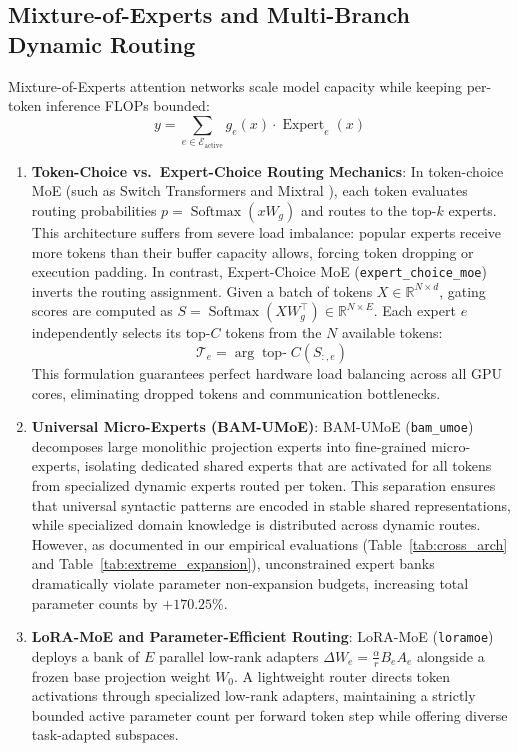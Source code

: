 \documentclass{article}
\begin{document}
\subsection{Mixture-of-Experts and Multi-Branch Dynamic Routing}
Mixture-of-Experts attention networks scale model capacity while keeping per-token inference FLOPs bounded:
\begin{equation}
    y = \sum_{e \in \mathcal{E}_{\text{active}}} g_e(x) \cdot \operatorname{Expert}_e(x)
\end{equation}
\begin{enumerate}
    \item \textbf{Token-Choice vs.\ Expert-Choice Routing Mechanics}:
    In token-choice MoE (such as Switch Transformers \citep{fedus2022switch} and Mixtral \citep{jiang2024mixtral}), each token evaluates routing probabilities $p = \operatorname{Softmax}(x W_g)$ and routes to the top-$k$ experts. This architecture suffers from severe load imbalance: popular experts receive more tokens than their buffer capacity allows, forcing token dropping or execution padding.
    In contrast, Expert-Choice MoE (\texttt{expert\_choice\_moe}) \citep{expert_choice_moe_2022} inverts the routing assignment. Given a batch of tokens $X \in \mathbb{R}^{N \times d}$, gating scores are computed as $S = \operatorname{Softmax}(X W_g^\top) \in \mathbb{R}^{N \times E}$. Each expert $e$ independently selects its top-$C$ tokens from the $N$ available tokens:
    \begin{equation}
        \mathcal{T}_e = \arg\operatorname{top-}C (S_{:, e})
    \end{equation}
    This formulation guarantees perfect hardware load balancing across all GPU cores, eliminating dropped tokens and communication bottlenecks.
    \item \textbf{Universal Micro-Experts (BAM-UMoE)}:
    BAM-UMoE (\texttt{bam\_umoe}) \citep{bam_umoe_2025} decomposes large monolithic projection experts into fine-grained micro-experts, isolating dedicated shared experts that are activated for all tokens from specialized dynamic experts routed per token. This separation ensures that universal syntactic patterns are encoded in stable shared representations, while specialized domain knowledge is distributed across dynamic routes. However, as documented in our empirical evaluations (Table~\ref{tab:cross_arch} and Table~\ref{tab:extreme_expansion}), unconstrained expert banks dramatically violate parameter non-expansion budgets, increasing total parameter counts by $+170.25\%$.
    \item \textbf{LoRA-MoE and Parameter-Efficient Routing}:
    LoRA-MoE (\texttt{loramoe}) \citep{zhang2023loramoe} deploys a bank of $E$ parallel low-rank adapters $\Delta W_e = \frac{\alpha}{r} B_e A_e$ alongside a frozen base projection weight $W_0$. A lightweight router directs token activations through specialized low-rank adapters, maintaining a strictly bounded active parameter count per forward token step while offering diverse task-adapted subspaces.
\end{enumerate}
\end{document}
